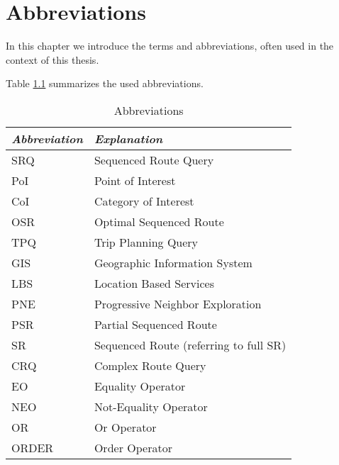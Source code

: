 \chapter{Abbreviations}
In this chapter we introduce the terms and abbreviations, often used in the context of this thesis.

Table \ref{abbr} summarizes the used abbreviations.

\begin{table}[h!]
	\centering
	\begin{tabular}{ |l|l| } 
		\hline
		\textit{Abbreviation} & \textit{Explanation} \\
		\hline
		SRQ & Sequenced Route Query \\ 

		PoI & Point of Interest \\ 
		
		CoI & Category of Interest \\ 

		OSR & Optimal Sequenced Route \\
		
		TPQ & Trip Planning Query \\
		
		GIS & Geographic Information System \\
		
		LBS & Location Based Services \\

		PNE & Progressive Neighbor Exploration \cite{OSR} \\ 

		PSR & Partial Sequenced Route \\ 

		SR & Sequenced Route (referring to full SR)\\
		
		CRQ & Complex Route Query \\
		
		EO & Equality Operator \\
		
		NEO & Not-Equality Operator \\
		
		OR & Or Operator \\
		
		ORDER & Order Operator \\
		\hline
	\end{tabular}
	\caption{Abbreviations}
	\label{abbr}
\end{table}